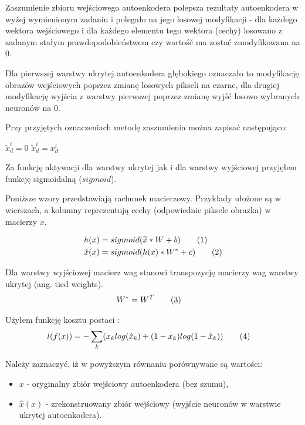 \documentclass[fleqn]{scrartcl}
\newcommand\numberthis{\addtocounter{equation}{1}\tag{\theequation}}
\begin{document}
Zaszumienie zbioru wejściowego autoenkodera polepsza rezultaty autoenkodera w wyżej wymienionym zadaniu i polegało na jego losowej modyfikacji - dla każdego wektora wejściowego i dla każdego elementu tego wektora (cechy) losowano z zadanym stałym prawdopodobieństwem czy wartość ma zostać zmodyfikowana na 0. 

Dla pierwszej warstwy ukrytej autoenkodera głębokiego oznaczało to modyfikację obrazów wejściowych poprzez zmianę losowych pikseli na czarne, dla drugiej modyfikację wyjścia z warstwy pierwszej poprzez zmianę wyjść losowo wybranych neuronów na 0.

Przy przyjętych oznaczeniach metodę zaszumienia można zapisać następująco:

\begin{algorithm}[H]
     {
         {
             {
                 $\widetilde{x}^{i}_{d} = 0$\;
             }
             {
                 $\widetilde{x}^{i}_{d} = x^{i}_{d}$
             }
         }
     }
\end{algorithm}

Za funkcję aktywacji dla warstwy ukrytej jak i dla warstwy wyjściowej przyjęłem funkcję sigmoidalną ($sigmoid$).

Poniższe wzory przedstawiają rachunek macierzowy. Przykłady ułożone są w wierszach, a kolumny reprezentują cechy (odpowiednie piksele obrazka) w macierzy $x$.

\begin{align*}
	&h(x) = sigmoid(\widetilde{x}*W+b) 		\numberthis \label{eq:1}\\
	&\hat{x}(x) = sigmoid(h(x)*W^{*}+c) \numberthis \label{eq:2}\\
\end{align*}

Dla warstwy wyjściowej macierz wag stanowi transpozycję macierzy wag warstwy ukrytej (ang. tied weights).
\begin{align*}
	&W^{*} = W^{T}						\numberthis \label{eq:3}
\end{align*}

Użyłem funkcję kosztu postaci \cite{cite:ae_cost}:
\begin{align*}
	&l(f(x))=-\sum_{k} (x_{k}log(\hat{x}_{k})+(1-x_{k})log(1-\hat{x}_{k})) \numberthis \label{eq:3}
\end{align*}

Należy zaznaczyć, iż w powyższym równaniu porównywane są wartości:
\begin{itemize}
  \item $x$ - oryginalny zbiór wejściowy autoenkodera (bez szumu),
  \item $\hat{x}(x)$ - zrekonstruowany zbiór wejściowy (wyjście neuronów w warstwie ukrytej autoenkodera).
\end{itemize}
\end{document}
